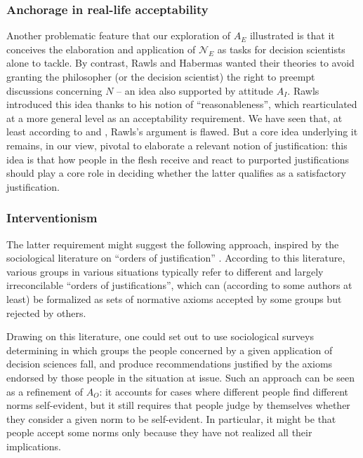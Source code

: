 \documentclass[preprint, french, english, 11pt, authoryear]{elsarticle}%
\begin{document}
\subsubsection{Anchorage in real-life acceptability}
Another problematic feature that our exploration of $A_E$ illustrated is that it conceives the elaboration and application of $\mathscr{N}_E$ as tasks for decision scientists alone to tackle. By contrast, Rawls and Habermas wanted their theories to avoid granting the philosopher (or the decision scientist) the right to preempt discussions concerning $N$ -- an idea also supported by attitude $A_I$. Rawls introduced this idea thanks to his notion of ``reasonableness'', which \cite{estlund_democratic_2009} rearticulated at a more general level as an acceptability requirement. We have seen that, at least according to \cite{habermas_reconciliation_1995} and \cite{estlund_democratic_2009}, Rawls's argument is flawed. But a core idea underlying it remains, in our view, pivotal to elaborate a relevant notion of justification: this idea is that how people in the flesh receive and react to purported justifications should play a core role in deciding whether the latter qualifies as a satisfactory justification.

\subsubsection{Interventionism}
The latter requirement might suggest the following approach, inspired by the sociological literature on “orders of justification” \citep{boltanski_justification_2006}. According to this literature, various groups in various situations typically refer to different and largely irreconcilable “orders of justifications”, which can (according to some authors at least) be formalized as sets of normative axioms accepted by some groups but rejected by others.

Drawing on this literature, one could set out to use sociological surveys determining in which groups the people concerned by a given application of decision sciences fall, and produce recommendations justified by the axioms endorsed by those people in the situation at issue. Such an approach can be seen as a refinement of $A_O$: it accounts for cases where different people find different norms self-evident, but it still requires that people judge by themselves whether they consider a given norm to be self-evident. In particular, it might be that people accept some norms only because they have not realized all their implications.
\end{document}
